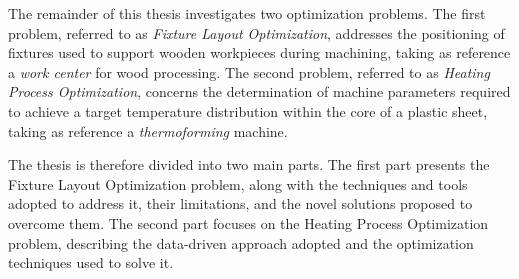 The remainder of this thesis investigates two optimization problems. The first problem, referred to as \textit{Fixture Layout Optimization}, addresses the positioning of fixtures used to support wooden workpieces during machining, taking as reference a \textit{work center} for wood processing. The second problem, referred to as \textit{Heating Process Optimization}, concerns the determination of machine parameters required to achieve a target temperature distribution within the core of a plastic sheet, taking as reference a \textit{thermoforming} machine.

The thesis is therefore divided into two main parts. The first part presents the Fixture Layout Optimization problem, along with the techniques and tools adopted to address it, their limitations, and the novel solutions proposed to overcome them. The second part focuses on the Heating Process Optimization problem, describing the data-driven approach adopted and the optimization techniques used to solve it.
